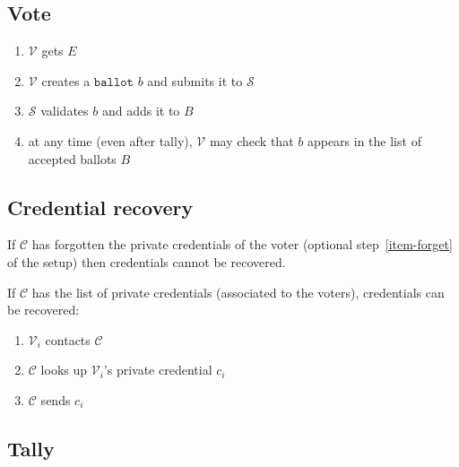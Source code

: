 \documentclass[a4paper]{article}
\newcommand{\ballot}{\texttt{ballot}}
\begin{document}
\subsection{Vote}

\begin{enumerate}
\item $\mathcal{V}$ gets $E$
\item $\mathcal{V}$ creates a \hyperref[ballots]{$\ballot$} $b$ and submits it to $\mathcal{S}$
\item $\mathcal{S}$ validates $b$ and adds it to $B$
\item at any time (even after tally), $\mathcal{V}$ may check that $b$
  appears in the list of accepted ballots $B$
\end{enumerate}


\subsection{Credential recovery}

If $\mathcal C$ has forgotten the private credentials of the voter
(optional step~\ref{item-forget} of the setup) then credentials cannot
be recovered.

If $\mathcal C$ has the list of private credentials (associated to the
voters), credentials can be recovered:
\begin{enumerate}
\item $\mathcal{V}_i$ contacts $\mathcal{C}$
\item $\mathcal{C}$ looks up $\mathcal{V}_i$'s private credential $c_i$
\item $\mathcal{C}$ sends $c_i$
\end{enumerate}

\subsection{Tally}
\end{document}

